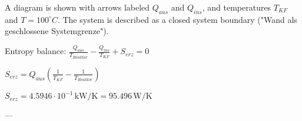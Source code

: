 A diagram is shown with arrows labeled \( Q_{aus} \) and \( Q_{ins} \), and temperatures \( T_{KF} \) and \( T = 100^\circ C \). The system is described as a closed system boundary ("Wand als geschlossene Systemgrenze").  

Entropy balance:  
\( \frac{Q_{aus}}{T_{Reaktor}} - \frac{Q_{ins}}{T_{KF}} + S_{erz} = 0 \)  

\( S_{erz} = Q_{aus} \left( \frac{1}{T_{KF}} - \frac{1}{T_{Reaktor}} \right) \)  

\( S_{erz} = 4.5946 \cdot 10^{-1} \, \text{kW/K} = 95.496 \, \text{W/K} \)  

---